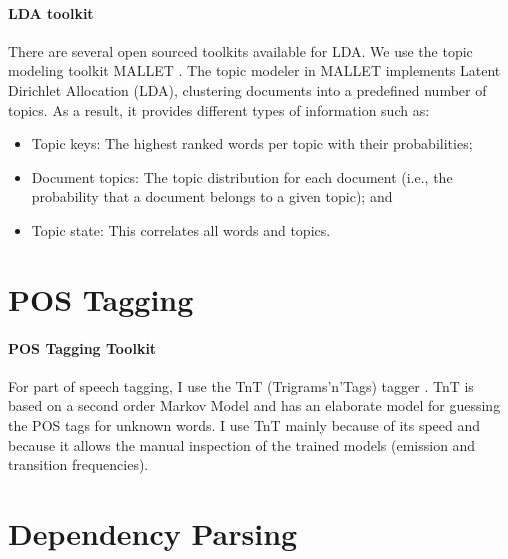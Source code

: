 \paragraph*{LDA toolkit}

There are several  open sourced toolkits available for LDA. We use the topic modeling toolkit MALLET \cite{McCallumMALLET}.  The
topic modeler in MALLET implements Latent Dirichlet Allocation (LDA), clustering
documents into a predefined number of topics. As a result, it provides
different types of information such as:

\begin{itemize}
	\item  Topic keys:  The highest ranked words per topic with their probabilities; 
	
	\item Document topics: The topic distribution for each document (i.e., the probability that a document belongs to a given topic); and 
	
	\item Topic state: This correlates all words and topics.
	
\end{itemize}

\section{POS Tagging}

\paragraph*{POS Tagging Toolkit}

For part of speech tagging, I use the TnT (Trigrams'n'Tags) tagger \cite{brants:00.2}. TnT is based on a second order Markov Model and has an elaborate model for guessing the POS tags for unknown words. I use TnT mainly because of its speed and because it allows the manual inspection of the trained models (emission and transition frequencies).

\section{Dependency Parsing}

